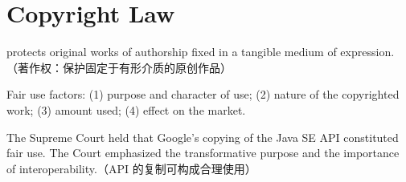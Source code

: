 \documentclass{lexnote}
\begin{document}

\section{Copyright Law}

 protects original works of authorship fixed in a tangible medium of expression.（著作权：保护固定于有形介质的原创作品）

\begin{statute}
  Fair use factors: (1) purpose and character of use;
  (2) nature of the copyrighted work; (3) amount used;
  (4) effect on the market.
\end{statute}

\begin{case}
  The Supreme Court held that Google's copying of the Java SE API
  constituted fair use. The Court emphasized the transformative purpose
  and the importance of interoperability.（API 的复制可构成合理使用）
\end{case}
\end{document}
